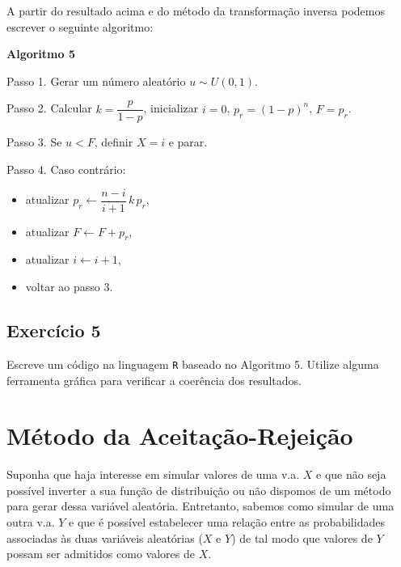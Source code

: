 \documentclass[
  letterpaper,
  DIV=11,
  numbers=noendperiod]{scrreprt}
\begin{document}
A partir do resultado acima e do método da transformação inversa podemos
escrever o seguinte algoritmo:

\begin{tcolorbox}[enhanced jigsaw, left=2mm, rightrule=.15mm, toprule=.15mm, opacityback=0, leftrule=.75mm, colframe=quarto-callout-warning-color-frame, colback=white, breakable, arc=.35mm, bottomrule=.15mm]

\vspace{-3mm}\textbf{Algoritmo 5}\vspace{3mm}

Passo 1. Gerar um número aleatório \(u \sim U(0,1)\).

Passo 2. Calcular \(k = \dfrac{p}{1-p}\), inicializar \(i = 0\),
\(p_r = (1-p)^n\), \(F = p_r\).

Passo 3. Se \(u < F\), definir \(X = i\) e parar.

Passo 4. Caso contrário:

\begin{itemize}
\item
  atualizar \(p_r \leftarrow \dfrac{n-i}{i+1}\,k\,p_r\),
\item
  atualizar \(F \leftarrow F + p_r\),
\item
  atualizar \(i \leftarrow i+1\),
\item
  voltar ao passo 3.
\end{itemize}

\end{tcolorbox}

\subsection*{Exercício 5}\label{exercuxedcio-5}

Escreve um código na linguagem \texttt{R} baseado no Algoritmo 5.
Utilize alguma ferramenta gráfica para verificar a coerência dos
resultados.

\section{Método da
Aceitação-Rejeição}\label{muxe9todo-da-aceitauxe7uxe3o-rejeiuxe7uxe3o}

Suponha que haja interesse em simular valores de uma v.a. \(X\) e que
não seja possível inverter a sua função de distribuição ou não dispomos
de um método para gerar dessa variável aleatória. Entretanto, sabemos
como simular de uma outra v.a. \(Y\) e que é possível estabelecer uma
relação entre as probabilidades associadas às duas variáveis aleatórias
(\(X\) e \(Y\)) de tal modo que valores de \(Y\) possam ser admitidos
como valores de \(X\).
\end{document}
